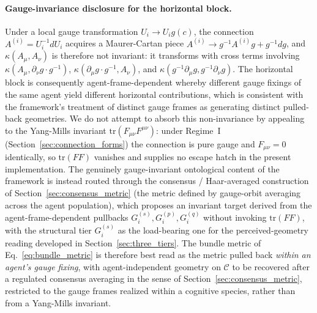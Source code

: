 \documentclass[11pt]{article}
\begin{document}
\paragraph{Gauge-invariance disclosure for the horizontal block.}
Under a local gauge transformation $U_i \to U_i g(c)$, the connection $A^{(i)} = U_i^{-1} dU_i$ acquires a Maurer-Cartan piece $A^{(i)} \to g^{-1} A^{(i)} g + g^{-1} dg$, and $\kappa(A_\mu, A_\nu)$ is therefore not invariant: it transforms with cross terms involving $\kappa(A_\mu, \partial_\nu g \cdot g^{-1})$, $\kappa(\partial_\mu g \cdot g^{-1}, A_\nu)$, and $\kappa(g^{-1} \partial_\mu g, g^{-1} \partial_\nu g)$. The horizontal block is consequently agent-frame-dependent whereby different gauge fixings of the same agent yield different horizontal contributions, which is consistent with the framework's treatment of distinct gauge frames as generating distinct pulled-back geometries. We do not attempt to absorb this non-invariance by appealing to the Yang-Mills invariant $\mathrm{tr}(F_{\mu\nu} F^{\mu\nu})$: under Regime~I (Section~\ref{sec:connection_forms}) the connection is pure gauge and $F_{\mu\nu} = 0$ identically, so $\mathrm{tr}(FF)$ vanishes and supplies no escape hatch in the present implementation. The genuinely gauge-invariant ontological content of the framework is instead routed through the consensus / Haar-averaged construction of Section~\ref{sec:consensus_metric} (the metric defined by gauge-orbit averaging across the agent population), which proposes an invariant target derived from the agent-frame-dependent pullbacks $G_i^{(s)}, G_i^{(p)}, G_i^{(q)}$ without invoking $\mathrm{tr}(FF)$, with the structural tier $G_i^{(s)}$ as the load-bearing one for the perceived-geometry reading developed in Section~\ref{sec:three_tiers}. The bundle metric of Eq.~\eqref{eq:bundle_metric} is therefore best read as the metric pulled back \emph{within an agent's gauge fixing}, with agent-independent geometry on $\mathcal{C}$ to be recovered after a regulated consensus averaging in the sense of Section~\ref{sec:consensus_metric}, restricted to the gauge frames realized within a cognitive species, rather than from a Yang-Mills invariant.
\end{document}

